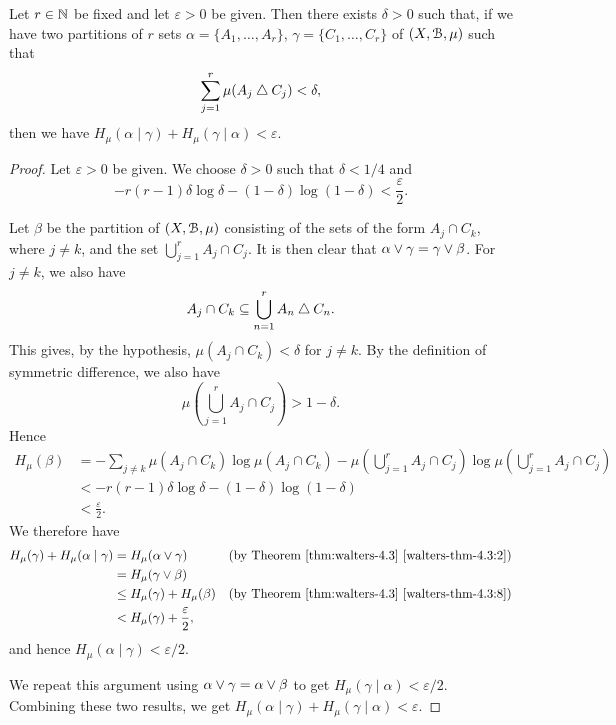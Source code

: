 \begin{lemma} \label{lem:walters-4-15}
	Let $r \in \mathbb{N}$ be fixed and let $\varepsilon > 0$ be given. Then there exists $\delta > 0$ such that, if we have two partitions of $r$ sets $\alpha = \{A_1, \dots, A_r\}$, $\gamma = \{C_1, \dots, C_r\}$ of $(X, \mathcal{B}, \mu)$ such that
	\[
		\sum_{j = 1}^r{\mu(A_j \bigtriangleup C_j)} < \delta,
	\]
	then we have $H_\mu(\alpha \mid \gamma) + H_\mu(\gamma \mid \alpha) < \varepsilon$.
	\begin{proof}
		Let $\varepsilon > 0$ be given. We choose $\delta > 0$ such that $\delta < 1 / 4$ and
		\[
			-r(r - 1) \delta \log{\delta} - (1 - \delta) \log(1 - \delta) < \frac{\varepsilon}{2}.
		\]
		
		Let $\beta$ be the partition of $(X, \mathcal{B}, \mu)$ consisting of the sets of the form $A_j \cap C_k$, where $j \neq k$, and the set $\bigcup_{j = 1}^r{A_j \cap C_j}$. It is then clear that $\alpha \vee \gamma = \gamma \vee \beta$. For $j \neq k$, we also have
		\[
			A_j \cap C_k \subseteq \bigcup_{n = 1}^r{A_n \bigtriangleup C_n}.
		\]
		This gives, by the hypothesis, $\mu(A_j \cap C_k) < \delta$ for $j \neq k$. By the definition of symmetric difference, we also have
		\[
			\mu\left(\bigcup_{j = 1}^r{A_j \cap C_j}\right) > 1 - \delta.
		\]
		Hence
		\begin{align*}
			H_\mu(\beta) &= -\sum_{j \neq k}{\mu(A_j \cap C_k) \log{\mu(A_j \cap C_k)}} - \mu\left(\bigcup_{j = 1}^r{A_j \cap C_j}\right) \log{\mu\left(\bigcup_{j = 1}^r{A_j \cap C_j}\right)} \\
				&< -r(r - 1) \delta \log{\delta} - (1 - \delta) \log(1 - \delta) \\
				&< \frac{\varepsilon}{2}.
		\end{align*}
		We therefore have
		\begin{align*}
			H_\mu(\gamma) + H_\mu(\alpha \mid \gamma) &= H_\mu(\alpha \vee \gamma) & \text{(by Theorem \ref{thm:walters-4.3} \ref{walters-thm-4.3:2})} \\
				&= H_\mu(\gamma \vee \beta) \\
				&\leq H_\mu(\gamma) + H_\mu(\beta) & \text{(by Theorem \ref{thm:walters-4.3} \ref{walters-thm-4.3:8})} \\
				&< H_\mu(\gamma) + \frac{\varepsilon}{2},
		\end{align*}
		and hence $H_\mu(\alpha \mid \gamma) < \varepsilon / 2$.
		
		We repeat this argument using $\alpha \vee \gamma = \alpha \vee \beta$ to get $H_\mu(\gamma \mid \alpha) < \varepsilon / 2$. Combining these two results, we get $H_\mu(\alpha \mid \gamma) + H_\mu(\gamma \mid \alpha) < \varepsilon$.
	\end{proof}
\end{lemma}

